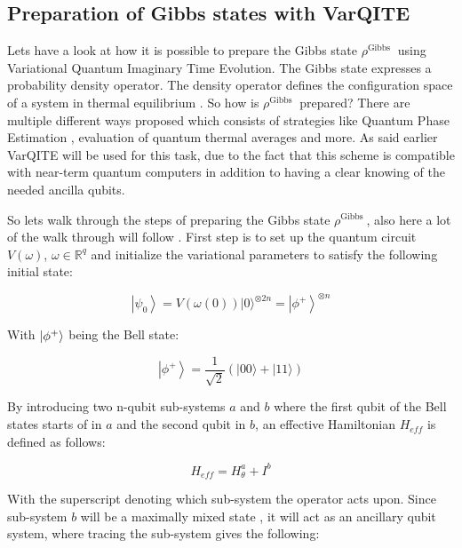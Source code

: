 \documentclass[../main.tex]{subfiles}
\begin{document}
\subsection{Preparation of Gibbs states with VarQITE}
Lets have a look at how it is possible to prepare the Gibbs state $\rho^{\text {Gibbs }}$ using Variational Quantum Imaginary Time Evolution. The Gibbs state expresses a probability density operator. The density operator defines the configuration space of a system in thermal equilibrium \cite{GibbsElementaryPI} \cite{VQB:litteraturelist}. So how is $\rho^{\text {Gibbs }}$ prepared? There are multiple different ways proposed which consists of strategies like Quantum Phase Estimation \cite{Temme_2011, Yung_2012, Poulin_2009}, evaluation of quantum thermal averages \cite{Motta_2019, brandao2019finite, kastoryano2016quantum} and more. As said earlier VarQITE will be used for this task, due to the fact that this scheme is compatible with near-term quantum computers in addition to having a clear knowing of the needed ancilla qubits.

So lets walk through the steps of preparing the Gibbs state $\rho^{\text {Gibbs }}$, also here a lot of the walk through will follow \cite{VQB:litteraturelist}. First step is to set up the quantum circuit $V(\omega)$, $\omega \in \mathbb{R}^{q}$ and initialize the variational parameters to satisfy the following initial state:

\begin{equation}
\left|\psi_{0}\right\rangle=V(\omega(0))|0\rangle^{\otimes 2 n}=\left|\phi^{+}\right\rangle^{\otimes n}
\end{equation}

With $\ket{\phi^+}$ being the Bell state:

\begin{equation}
\left|\phi^{+}\right\rangle=\frac{1}{\sqrt{2}}(|00\rangle+|11\rangle)
\end{equation}

By introducing two n-qubit sub-systems $a$ and $b$ where the first qubit of the Bell states starts of in $a$ and the second qubit in $b$, an effective Hamiltonian $H_{eff}$ is defined as follows:

\begin{equation}
H_{eff}=H_{\theta}^{a}+I^{b}
\end{equation}

With the superscript denoting which sub-system the operator acts upon. Since sub-system $b$ will be a maximally mixed state \cite{VQB:litteraturelist}, it will act as an ancillary qubit system, where tracing the sub-system gives the following:
\end{document}
